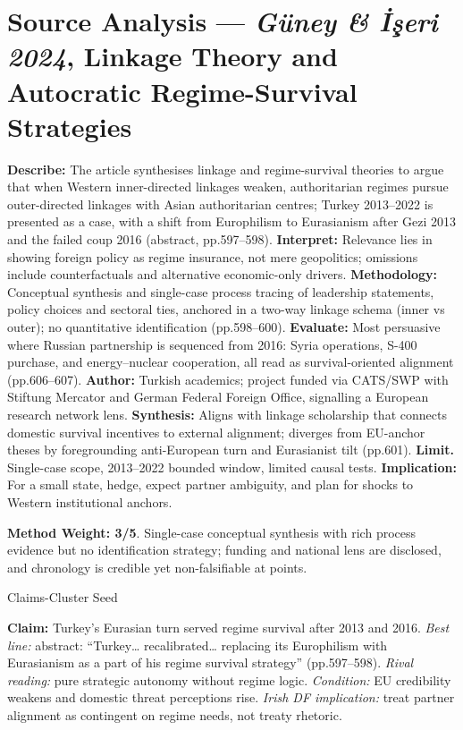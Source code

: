 \section*{Source Analysis — \textit{Güney & İşeri 2024}, Linkage Theory and Autocratic Regime-Survival Strategies}
\textbf{Describe:} The article synthesises linkage and regime-survival theories to argue that when Western inner-directed linkages weaken, authoritarian regimes pursue outer-directed linkages with Asian authoritarian centres; Turkey 2013–2022 is presented as a case, with a shift from Europhilism to Eurasianism after Gezi 2013 and the failed coup 2016 (abstract, pp.597–598).
\textbf{Interpret:} Relevance lies in showing foreign policy as regime insurance, not mere geopolitics; omissions include counterfactuals and alternative economic-only drivers.
\textbf{Methodology:} Conceptual synthesis and single-case process tracing of leadership statements, policy choices and sectoral ties, anchored in a two-way linkage schema (inner vs outer); no quantitative identification (pp.598–600).
\textbf{Evaluate:} Most persuasive where Russian partnership is sequenced from 2016: Syria operations, S-400 purchase, and energy–nuclear cooperation, all read as survival-oriented alignment (pp.606–607).
\textbf{Author:} Turkish academics; project funded via CATS/SWP with Stiftung Mercator and German Federal Foreign Office, signalling a European research network lens.
\textbf{Synthesis:} Aligns with linkage scholarship that connects domestic survival incentives to external alignment; diverges from EU-anchor theses by foregrounding anti-European turn and Eurasianist tilt (pp.601).
\textbf{Limit.} Single-case scope, 2013–2022 bounded window, limited causal tests. \textbf{Implication:} For a small state, hedge, expect partner ambiguity, and plan for shocks to Western institutional anchors.

\textbf{Method Weight: 3/5}. Single-case conceptual synthesis with rich process evidence but no identification strategy; funding and national lens are disclosed, and chronology is credible yet non-falsifiable at points.

Claims-Cluster Seed

\textbf{Claim:} Turkey’s Eurasian turn served regime survival after 2013 and 2016. \textit{Best line:} abstract: “Turkey… recalibrated… replacing its Europhilism with Eurasianism as a part of his regime survival strategy” (pp.597–598). \textit{Rival reading:} pure strategic autonomy without regime logic. \textit{Condition:} EU credibility weakens and domestic threat perceptions rise. \textit{Irish DF implication:} treat partner alignment as contingent on regime needs, not treaty rhetoric.

